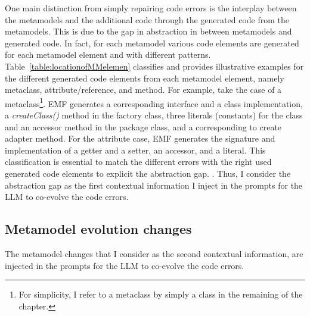 One main distinction from simply repairing code errors is the interplay between the metamodels and the additional code through the generated code from the metamodels. This is due to the gap in abstraction in between metamodels and generated code. In fact, for each metamodel various code elements are generated for each metamodel element and with different patterns.
Table~\ref{table:locationofMMelemen} classifies and provides illustrative examples for the different generated code elements from each metamodel element, namely metaclass, attribute/reference, and method.  %
For example, take the case of a metaclass\footnote{For simplicity, I refer to a metaclass by simply a class in the remaining of the chapter.}. EMF generates a corresponding interface and a class implementation, a \emph{createClass()} method in the factory class, three literals (\ie constants) for the class and an accessor method in the package class, and a corresponding to create adapter method. For the attribute case, EMF generates the signature and implementation of a getter and a setter, an accessor, and a literal. 
This classification is essential to match the different errors with the right used generated code elements to explicit the abstraction gap. . Thus, I consider the abstraction gap as the first contextual information I inject in the prompts for the LLM to co-evolve the code errors. 





\subsection{Metamodel evolution changes}
\label{ch3_mmchanges}
The metamodel changes that I consider as the second contextual information, are injected in the prompts for the LLM to co-evolve the code errors. 


